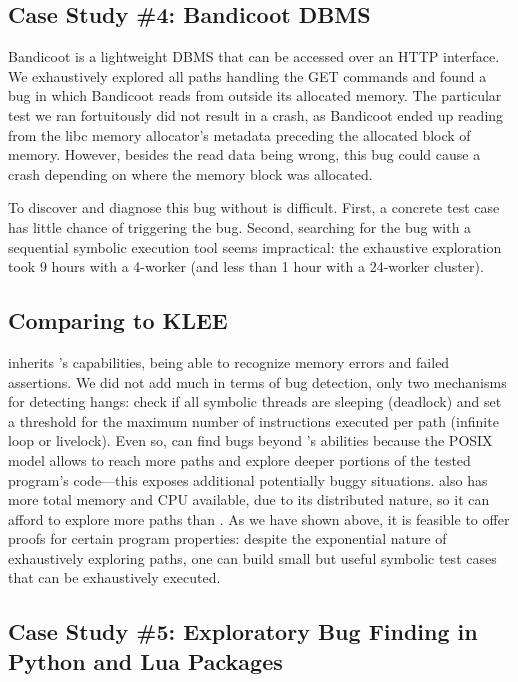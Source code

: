 \subsection{Case Study \#4: Bandicoot DBMS}
\label{sec:eval:bandicoot}

Bandicoot is a lightweight DBMS that can be accessed over an HTTP interface.  We exhaustively explored all paths handling the GET commands and found a bug in which Bandicoot reads from outside its allocated memory.  The particular test we ran fortuitously did not result in a crash, as Bandicoot ended up reading from the libc memory allocator's metadata preceding the allocated block of memory. However, besides the read data being wrong, this bug could cause a crash depending on where the memory block was allocated.

To discover and diagnose this bug without \cnine is difficult. First, a concrete test case has little chance of triggering the bug.  Second, searching for the bug with a sequential symbolic execution tool seems impractical: the exhaustive exploration took 9 hours with a 4-worker \cnine (and less than 1 hour with a 24-worker cluster). 

\subsection{Comparing \cnine to KLEE}

\cnine inherits \klee's capabilities, being able to recognize memory errors and failed assertions. We did not add much in terms of bug detection, only two mechanisms for detecting hangs: check if all symbolic threads are sleeping (deadlock) and set a threshold for the maximum number of instructions executed per path (infinite loop or livelock).  Even so, \cnine can find bugs beyond \klee's abilities because the POSIX model allows \cnine to reach more paths and explore deeper portions of the tested program's code---this exposes additional potentially buggy situations. \cnine also has more total memory and CPU available, due to its distributed nature, so it can afford to explore more paths than \klee.  As we have shown above, it is feasible to offer proofs for certain program properties: despite the exponential nature of exhaustively exploring paths, one can build small but useful symbolic test cases that can be exhaustively executed.


\subsection{Case Study \#5: Exploratory Bug Finding in Python and Lua Packages}
\label{sec:eval:bug-explore}

